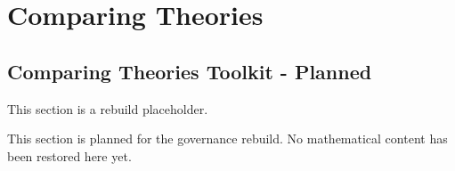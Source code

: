 \section{Comparing Theories}

\subsection*{Comparing Theories Toolkit - Planned}

\begin{exposition}
This section is a rebuild placeholder.
\end{exposition}

\begin{exposition}
This section is planned for the governance rebuild. No mathematical content has
been restored here yet.
\end{exposition}
